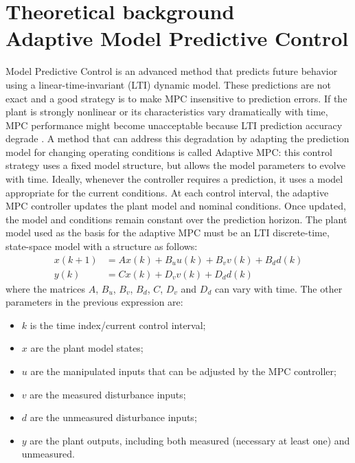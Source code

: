 \documentclass[conference,11pt]{IEEEtran}
\renewcommand{\vec}[1]{\ensuremath{\boldsymbol{\mathit{#1}}}}
\begin{document}
\section{Theoretical background\\ Adaptive Model Predictive Control}
Model Predictive Control is an advanced method that predicts future behavior using a linear-time-invariant (LTI) dynamic model. These predictions are not exact and a good strategy is to make MPC insensitive to prediction errors. If the plant is strongly nonlinear or its characteristics vary dramatically with time, MPC performance might become unacceptable because LTI prediction accuracy degrade \cite{mpctoolbox}. A method that can address this degradation by adapting the prediction model for changing operating conditions is called Adaptive MPC: this control strategy uses a fixed model structure, but allows the model parameters to evolve with time. Ideally, whenever the controller requires a prediction, it uses a model appropriate for the current conditions. At each control interval, the adaptive MPC controller updates the plant model and nominal conditions. Once updated, the model and conditions remain constant over the prediction horizon. The plant model used as the basis for the adaptive MPC must be an LTI discrete-time, state-space model with a structure as follows:
\begin{equation*}
\label{eqn:Adaptive_MPC_plant_discrete}
\begin{aligned}
\vec{x}(k+1)&=\vec{A}\vec{x}(k)+ \vec{B}_u \vec{u}(k)+\vec{B}_v \vec{v}(k)+\vec{B}_d \vec{d}(k)\\
\vec{y}(k)&=\vec{C}\vec{x}(k) + \vec{D}_v \vec{v}(k)+ \vec{D}_d \vec{d}(k)
\end{aligned}
\end{equation*}
where the matrices \vec{A}, $\vec{B}_u$, $\vec{B}_v$, $\vec{B}_d$, \vec{C}, $\vec{D}_v$ and $\vec{D}_d$ can vary with time. The other parameters in the previous expression are:
\begin{itemize}
	\item $k$ is the time index/current control interval;
	\item \vec{x} are the plant model states;
	\item \vec{u} are the manipulated inputs that can be adjusted by the MPC controller;
	\item \vec{v} are the measured disturbance inputs;
	\item \vec{d} are the unmeasured disturbance inputs;
	\item \vec{y} are the plant outputs, including both measured (necessary at least one) and unmeasured.
\end{itemize}
\end{document}
